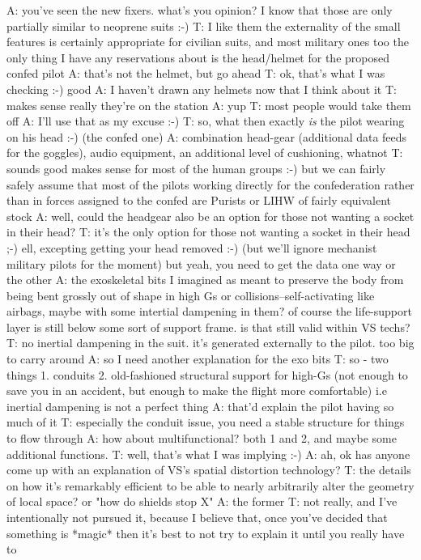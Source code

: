 A: you've seen the new fixers. what's you opinion? I know that those are only partially similar to neoprene suits :-)
T: I like them
the externality of the small features is certainly appropriate for civilian suits, and most military ones too
the only thing I have any reservations about is the head/helmet for the proposed confed pilot
A: that's not the helmet, but go ahead
T: ok, that's what I was checking :-)
good
A: I haven't drawn any helmets now that I think about it
T: makes sense really
they're on the station
A: yup
T: most people would take them off
A: I'll use that as my excuse :-)
T: so, what then exactly {\em is} the pilot wearing on his head :-)
(the confed one)
A: combination head-gear (additional data feeds for the goggles), audio equipment, an additional level of cushioning, whatnot
T: sounds good
makes sense for most of the human groups :-)
but we can fairly safely assume that most of the pilots working directly for the confederation rather than in forces assigned to the confed are Purists or LIHW of fairly equivalent stock
A: well, could the headgear also be an option for those not wanting a socket in their head?
T: it's the only option for those not wanting a socket in their head ;-)
ell, excepting getting your head removed :-)
(but we'll ignore mechanist military pilots for the moment)
but yeah, you need to get the data one way or the other
A: the exoskeletal bits I imagined as meant to preserve the body from being bent grossly out of shape in high Gs or collisions--self-activating like airbags, maybe with some intertial dampening in them? of course the life-support layer is still below
some sort of support frame. is that still valid within VS techs?
T: no inertial dampening in the suit. it's generated externally to the pilot.
too big to carry around
A: so I need another explanation for the exo bits
T: so - two things
1. conduits
2. old-fashioned structural support for high-Gs (not enough to save you in an accident, but enough to make the flight more comfortable)
i.e inertial dampening is not a perfect thing
A: that'd explain the pilot having so much of it
T: especially the conduit issue,
you need a stable structure for things to flow through
A: how about multifunctional? both 1 and 2, and maybe some additional functions.
T: well, that's what I was implying :-)
A: ah, ok
has anyone come up with an explanation of VS's spatial distortion technology?
T: the details on how it's remarkably efficient to be able to nearly arbitrarily alter the geometry of local space?
 or "how do shields stop X"
A: the former
T: not really, and I've intentionally not pursued it, because I believe that, once you've decided that something is *magic* then it's best to not try to explain it until you really have to
